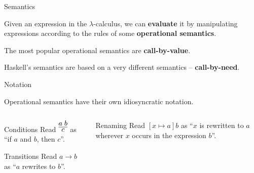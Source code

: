 %
\begin{frame}{Semantics}

Given an expression in the $\lambda$-calculus, we can \textbf{evaluate} it by
manipulating expressions according to the rules of some \textbf{operational
semantics}.

The most popular operational semantics are \textbf{call-by-value}.

Haskell's semantics are based on a very different semantics --
\textbf{call-by-need}.

\end{frame}

%
\begin{frame}{Notation}

Operational semantics have their own idiosyncratic notation.

\begin{columns}[t]
\begin{column}{0.5\textwidth}

\begin{block}{Conditions}
Read $\infer{c}{a \; b}$ as ``if $a$ and $b$, then $c$''.
\end{block}

\begin{block}{Transitions}
Read $a \to b$ as ``$a$ rewrites to $b$''.
\end{block}

\end{column}
\begin{column}{0.4\textwidth}

\begin{block}{Renaming}
Read $[x \mapsto a] b$ as ``$x$ is rewritten to $a$ wherever $x$ occurs in the 
expression $b$''.
\end{block}

\end{column}
\end{columns}

\end{frame}


